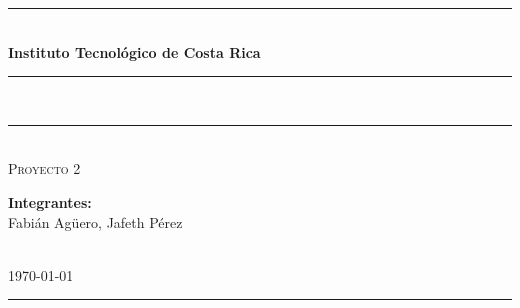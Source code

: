 \begin{titlepage}
    \centering
    \rule{\linewidth}{1pt}\\[0.5cm]
    {\LARGE\bfseries Instituto Tecnológico de Costa Rica}\\[0.5cm]
    \rule{\linewidth}{1pt}\\[1.5cm]
    \rule{0.7\linewidth}{0.4pt}\\[1cm]
    {\Large\textsc{Proyecto 2}}\\[1.5cm]
    \begin{minipage}{0.7\textwidth}
        \centering
        {\large\textbf{Integrantes:}\\[0.3cm]
        {\large Fabián Agüero, Jafeth Pérez}}
    \end{minipage}\\[1.5cm]
    {\large\today}\\[0.5cm]
    \rule{\linewidth}{1pt}
    \vfill
\end{titlepage}
